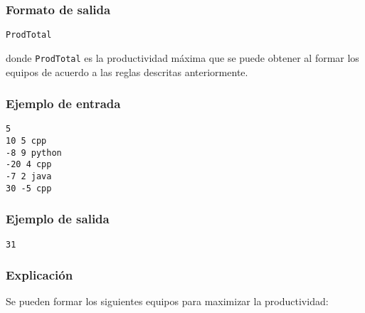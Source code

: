 \subsubsection*{Formato de salida}

\begin{verbatim}
ProdTotal
\end{verbatim}

donde \texttt{ProdTotal} es la productividad máxima que se puede obtener al formar los equipos de acuerdo a las reglas descritas anteriormente.

\subsubsection*{Ejemplo de entrada}

\begin{verbatim}
5
10 5 cpp
-8 9 python
-20 4 cpp
-7 2 java
30 -5 cpp
\end{verbatim}

\subsubsection*{Ejemplo de salida}

\begin{verbatim}
31
\end{verbatim}

\subsubsection*{Explicación}


Se pueden formar los siguientes equipos para maximizar la productividad:

